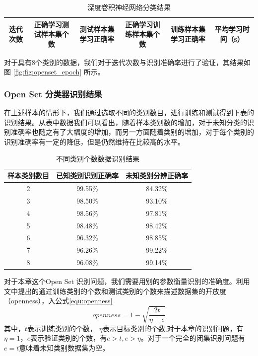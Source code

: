 \begin{table}[H]
	\renewcommand{\arraystretch}{1.3}
	\caption{深度卷积神经网络分类结果}
	\centering
	\begin{tabular}{c|c|c|c|c|c}
		\hline
		 迭代次数 & 正确学习测试样本集个数 & 测试样本集学习正确率 & 正确学习训练样本集个数 & 训练样本集学习正确率 & 平均学习时间（s） \\
		 \hline
		
		\hline
	\end{tabular}
\end{table}


对于具有8个类别的数据，我们对于迭代次数与识别准确率进行了验证，其结果如图 \ref{fig:fig:openset_epoch} 所示。
\subsubsection{Open Set 分类器识别结果}

在上述样本的情形下，我们通过选取不同的类别数目，进行训练和测试得到下表的识别结果。从表中数据我们可以看出，随着样本类别数的增加，对于未知分类的识别准确率也随之有了大幅度的增加，而另一方面随着类别的增加，对于每个类别的识别准确率有一定的降低，但是仍然维持在比较高的水平。


\begin{table}[H]
	\renewcommand{\arraystretch}{1.3}
	\caption{不同类别个数数据识别结果}
	\label{tab:nb_classes}
	\centering
	\begin{tabular}{ccc}
		\hline
		 样本类别数目 & 已知类别识别正确率 & 未知类别分辨正确率 \\
		\hline
		2 & 99.55\% & 84.32\% \\
		\hline
		3 & 98.50\% & 93.10\% \\		
		\hline
		4 & 98.56\% & 97.81\% \\		
		\hline
		5 & 98.48\% & 98.42\% \\		
		\hline
		6 & 96.32\% & 98.85\% \\		
		\hline
		7 & 96.26\% & 99.22\% \\		
		\hline
		8 & 96.08\% & 99.14\% \\		
		\hline
	\end{tabular}
\end{table}

对于本章这个Open Set 识别问题，我们需要用别的参数衡量识别的准确度。利用文\cite{scheirer2013toward}中提出的通过训练类别的个数和测试类别的个数来描述数据集的开放度（openness），入公式\ref{equ:openness}
\begin{equation}
	openness = 1-\sqrt{\frac{2t}{\eta+e}}
	\label{equ:openness}
\end{equation}
其中，$t$表示训练类别的个数， $\eta $表示目标类别的个数,对于本章的识别问题，有$\eta=1$，$e$表示验证类别的个数，有$e>t,e>\eta$。对于一个完全的闭集识别问题有$e=t$意味着未知类别数据集为空。

